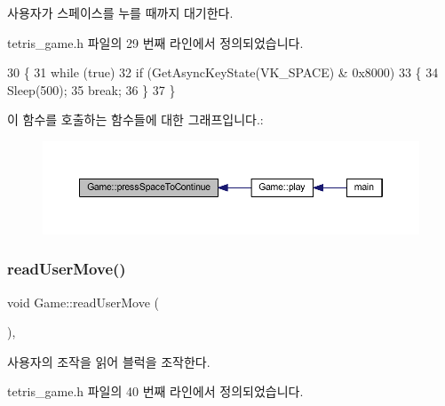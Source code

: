 사용자가 스페이스를 누를 때까지 대기한다. 



tetris\+\_\+game.\+h 파일의 29 번째 라인에서 정의되었습니다.


\begin{DoxyCode}
30     \{
31         \textcolor{keywordflow}{while} (\textcolor{keyword}{true})
32             \textcolor{keywordflow}{if} (GetAsyncKeyState(VK\_SPACE) & 0x8000)
33             \{
34                 Sleep(500);
35                 \textcolor{keywordflow}{break};
36             \}
37     \}
\end{DoxyCode}
이 함수를 호출하는 함수들에 대한 그래프입니다.\+:
\nopagebreak
\begin{figure}[H]
\begin{center}
\leavevmode
\includegraphics[width=350pt]{class_game_a00e70c3fa536c8b76e92aaca66c5ccc2_icgraph}
\end{center}
\end{figure}
\mbox{\label{class_game_aeb128045605ef167c233da9f993d407d}} 
\subsubsection{\texorpdfstring{read\+User\+Move()}{readUserMove()}}
{\footnotesize\ttfamily void Game\+::read\+User\+Move (\begin{DoxyParamCaption}{ }\end{DoxyParamCaption})\hspace{0.3cm}{\ttfamily [inline]}, {\ttfamily [private]}}



사용자의 조작을 읽어 블럭을 조작한다. 



tetris\+\_\+game.\+h 파일의 40 번째 라인에서 정의되었습니다.


